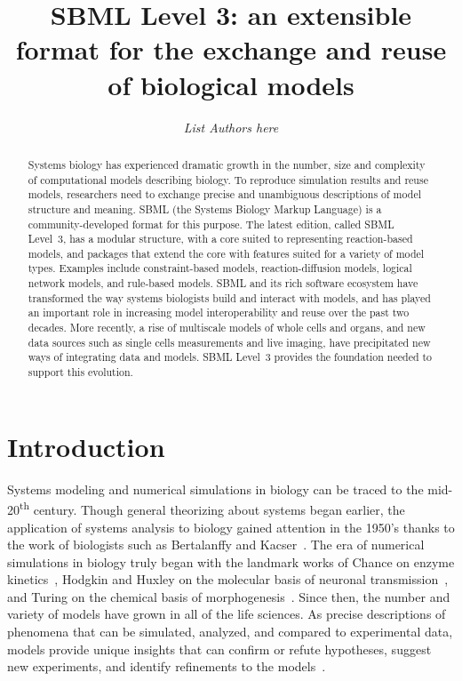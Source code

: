 \documentclass[]{draft-sbml-paper}
\title{SBML Level 3: an extensible format for the exchange and reuse\\of biological models}
\author[1]{\emph{List Authors here}}
\begin{document}
\maketitle

\begin{abstract}
Systems biology has experienced dramatic growth in the number, size and complexity of computational models describing biology. To reproduce simulation results and reuse models, researchers need to exchange precise and unambiguous descriptions of model structure and meaning. SBML (the Systems Biology Markup Language) is a community-developed format for this purpose. The latest edition, called SBML Level~3, has a modular structure, with a core suited to representing reaction-based models, and packages that extend the core with features suited for a variety of model types. Examples include constraint-based models, reaction-diffusion models, logical network models, and rule-based models. SBML and its rich software ecosystem have transformed the way systems biologists build and interact with models, and has played an important role in increasing model interoperability and reuse over the past two decades. More recently, a rise of multiscale models of whole cells and organs, and new data sources such as single cells measurements and live imaging, have precipitated new ways of integrating data and models. SBML Level~3 provides the foundation needed to support this evolution.
\end{abstract}

\clearpage

\section*{Introduction}

Systems modeling and numerical simulations in biology can be traced to the mid-20\textsuperscript{th} century. Though general theorizing about systems began earlier, the application of systems analysis to biology gained attention in the 1950's thanks to the work of biologists such as Bertalanffy and Kacser~\citep{Von_Bertalanffy1950-dy, Von_Bertalanffy1950-wa, Kacser1957-ox, kell2006theodor}. The era of numerical simulations in biology truly began with the landmark works of Chance on enzyme kinetics~\citep{chance1952mechanism, Chance2005stoppedflow, chance1940kinetics}, Hodgkin and Huxley on the molecular basis of neuronal transmission~\citep{hodgkin1952quantitative}, and Turing on the chemical basis of morphogenesis~\citep{turing1990chemical}. Since then, the number and variety of models have grown in all of the life sciences. As precise descriptions of phenomena that can be simulated, analyzed, and compared to experimental data, models provide unique insights that can confirm or refute hypotheses, suggest new experiments, and identify refinements to the models~\citep{Heinrich1996, le_novere_2015}.
\end{document}
